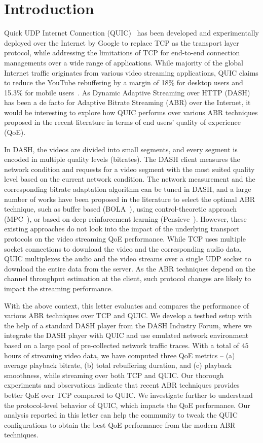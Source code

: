 \section{Introduction}
Quick UDP Internet Connection (QUIC)~\cite{langley2017quic} has been developed and experimentally deployed over the Internet by Google to replace TCP as the transport layer protocol, while addressing the limitations of TCP for end-to-end connection managements over a wide range of applications. While majority of the global Internet traffic originates from various video streaming applications, QUIC claims to reduce the YouTube rebuffering by a margin of 18\% for desktop users and 15.3\% for mobile users~\cite{langley2017quic}. As Dynamic Adaptive Streaming over HTTP (DASH)~\cite{stockhammer2011dynamic} has been a de facto for Adaptive Bitrate Streaming (ABR) over the Internet, it would be interesting to explore how QUIC performs over various ABR techniques proposed in the recent literature in terms of end users' quality of experience (QoE).


In DASH, the videos are divided into small segments, and every segment is encoded in multiple quality levels (bitrates). The DASH client measures the network condition and requests for a video segment with the most suited quality level based on the current network condition. The network measurement and the corresponding bitrate adaptation algorithm can be tuned in DASH, and a large number of works have been proposed in the literature to select the optimal ABR technique, such as buffer based (BOLA~\cite{Spiteri2016}), using control-theoretic approach (MPC~\cite{yin2015control}), or based on deep reinforcement learning (Pensieve~\cite{mao2017neural}). However, these existing approaches do not look into the impact of the underlying transport protocols on the video streaming QoE performance. While TCP uses multiple socket connections to download the video and the corresponding audio data, QUIC multiplexes the audio and the video streams over a single UDP socket to download the entire data from the server. 
As the ABR techniques depend on the channel throughput estimation at the client, such protocol changes are likely to impact the streaming performance. 


With the above context, this letter evaluates and compares the performance of various ABR techniques over TCP and QUIC. We develop a testbed setup with the help of a standard DASH player from the DASH Industry Forum, where we integrate the DASH player with QUIC and use emulated network environment based on a large pool of pre-collected network traffic traces.
With a total of $45$ hours of streaming video data, we have computed three QoE metrics -- (a) average playback bitrate, (b) total rebuffering duration, and (c) playback smoothness, while streaming over both TCP and QUIC. Our thorough experiments and observations indicate that recent ABR techniques provides better QoE over TCP compared to QUIC. We investigate further to understand the protocol-level behavior of QUIC, which impacts the QoE performance.
Our analysis reported in this letter can help the community to tweak the QUIC configurations to obtain the best QoE performance from the modern ABR techniques.

